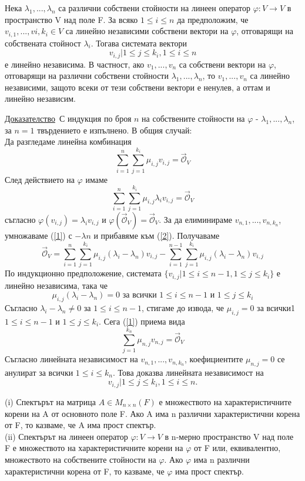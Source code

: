 \documentclass{article}
\newcommand*{\nullvec}{\vec{\mathcal{O}}}
\newcommand{\dok}{\underline{Доказателство}\  }
\newcommand{\tvurdenie}[2]{
    \begin{tcolorbox}[title = #1 ,colframe = blue!70!black, colback = blue!10!white]
        #2
    \end{tcolorbox}
}
\newcommand{\opredelenie}[2]{
    \begin{tcolorbox}[title = #1 ,colframe = red!70!black, colback = red!10!white]
        #2
    \end{tcolorbox}
}
\begin{document}
\tvurdenie{Твърдение 18.6}{
    Нека $\lambda_1, ... , \lambda_n$ са различни собствени стойности на
    линеен оператор $\varphi : V \rightarrow V$ в пространство V над поле F. За всяко
    $1 \leq i \leq n$ да предположим, че $v_{i,1}, ... , v{i,k_i} \in V$ са линейно независими
    собствени вектори на $\varphi$, отговарящи на собствената стойност $\lambda_i$.
    Тогава системата вектори
    \[
        {v_{i,j} | 1 \leq j \leq k_i, 1 \leq i \leq n}
    \]
    е линейно независима.
    В частност, ако $v_1, ... , v_n$ са собствени вектори на $\varphi$, отговарящи
    на различни собствени стойности $\lambda_1, ... , \lambda_n$, то $v_1, ... , v_n$ са линейно
    независими, защото всеки от тези собствени вектори е ненулев, а оттам и линейно независим.
}
\dok С индукция по броя $n$ на собствените стойности  на
$\varphi$ - $\lambda_1, ... , \lambda_n$, за $n = 1$ твърдението е изпълнено. В общия случай:\\
Да разгледаме линейна комбинация
\begin{equation}\label{1}
    \sum_{i=1}^{n} \sum_{j=1}^{k_i}  \mu_{i,j}  v_{i,j} = \nullvec_V
\end{equation}
След действието на $\varphi$ имаме
\begin{equation}\label{2}
    \sum_{i=1}^{n} \sum_{j=1}^{k_i}  \mu_{i,j} \lambda_i v_{i,j} = \nullvec_V
\end{equation}
съгласно $\varphi(v_{i,j}) = \lambda_i v_{i,j}$ и $\varphi(\nullvec_V) = \nullvec_V$.
За да елиминираме $v_{n,1}, ... , v_{n,k_n}$, умножаваме (\ref*{1}) с $-\lambda n$ и прибавяме към (\ref*{2}). Получаваме
\[
    \nullvec_V = \sum_{i=1}^{n} \sum_{j=1}^{k_i}  \mu_{i,j} (\lambda_i-\lambda_n) v_{i,j}
    - \sum_{i=1}^{n-1} \sum_{j=1}^{k_i}  \mu_{i,j} (\lambda_i-\lambda_n) v_{i,j}
\]
По индукционно предположение, системата $\{v_{i,j} | 1 \leq i \leq n - 1, 1 \leq j \leq k_i\}$ е
линейно независима, така че
\[
    \mu_{i,j}(\lambda_i-\lambda_n)=0 \text{ за всички } 1 \leq i \leq n - 1 \text{ и } 1 \leq j \leq k_i
\]
Съгласно $\lambda_i-\lambda_n\neq 0$ за $1 \leq i \leq n - 1$, стигаме до извода, че $\mu_{i,j}=0$
за всички1 $1 \leq i \leq n - 1$ и $1 \leq j \leq k_i$. Сега (\ref*{1}) приема вида
\[
    \sum_{j=1}^{k_n}\mu_{n,j}v_{n,j}=\nullvec_V
\]
Съгласно линейната независимост на $v_{n,1}, ... , v_{n,k_n}$, коефициентите $\mu_{n,j} = 0$ се
анулират за всички $1 \leq i \leq k_n$. Това доказва линейната независимост на
\[
    {v_{i,j} | 1 \leq j \leq k_i, 1 \leq i \leq n}.
\]
\opredelenie{Определение 18.7}{
    (i) Спектърът на матрица $A \in M_{n\times n}(F)$ е множеството на характеристичните корени
    на A от основното поле F. Ако A има n различни характеристични корена от F, то казваме, че
    A има прост спектър.\\
    (ii) Спектърът на линеен оператор $\varphi : V \rightarrow V$ в n-мерно пространство
    V над поле F е множеството на характеристичните корени на $\varphi$ от
    F или, еквивалентно, множеството на собствените стойности на $\varphi$.
    Ако $\varphi$ има n различни характеристични корена от F, то казваме, че
    $\varphi$ има прост спектър.
}
\end{document}
